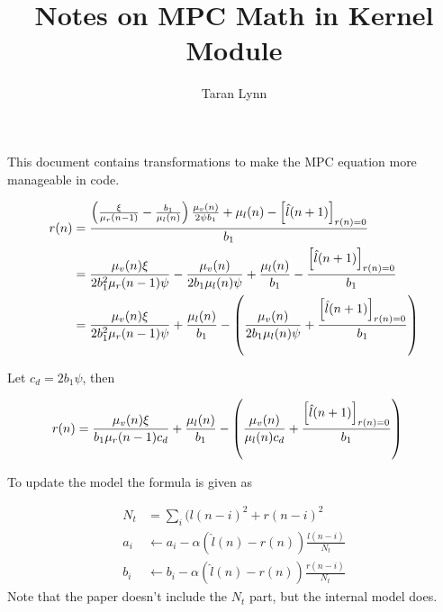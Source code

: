 \documentclass[12pt]{article}
\title{Notes on MPC Math in Kernel Module}
\author{Taran Lynn}
\begin{document}
\maketitle

This document contains transformations to make the MPC equation more manageable
in code.

\begin{align*}
    r(n) &= \frac{\del{\frac{\xi}{\mu_r(n - 1)} - \frac{b_1}{\mu_l(n)}} \frac{\mu_v(n)}{2\psi b_1}
    + \mu_l(n) - \sbr{\hat{l}(n + 1)}_{r(n) = 0}}{b_1}\\
    &= \frac{\mu_v(n) \xi}{2b_1^2 \mu_r(n - 1) \psi} - \frac{\mu_v(n)}{2b_1 \mu_l(n) \psi}
    + \frac{\mu_l(n)}{b_1} - \frac{\sbr{\hat{l}(n + 1)}_{r(n) = 0}}{b_1}\\
    &= \frac{\mu_v(n) \xi}{2b_1^2 \mu_r(n - 1) \psi}
    + \frac{\mu_l(n)}{b_1} - \del{\frac{\mu_v(n)}{2b_1 \mu_l(n) \psi}
    + \frac{\sbr{\hat{l}(n + 1)}_{r(n) = 0}}{b_1}}
\end{align*}

Let $c_d = 2b_1 \psi$, then

\begin{align*}
    r(n) &= \frac{\mu_v(n) \xi}{b_1 \mu_r(n - 1) c_d}
    + \frac{\mu_l(n)}{b_1} - \del{\frac{\mu_v(n)}{\mu_l(n) c_d}
    + \frac{\sbr{\hat{l}(n + 1)}_{r(n) = 0}}{b_1}}
\end{align*}

To update the model the formula is given as

\begin{align*}
  N_t &= \sum_i (l(n - i)^2 + r(n - i)^2\\
  a_i &\leftarrow a_i - \alpha (\hat{l}(n) - r(n)) \frac{l(n - i)}{N_t}\\
  b_i &\leftarrow b_i - \alpha (\hat{l}(n) - r(n)) \frac{r(n - i)}{N_t}
\end{align*}
Note that the paper doesn't include the $N_t$ part, but the internal model does.
\end{document}

